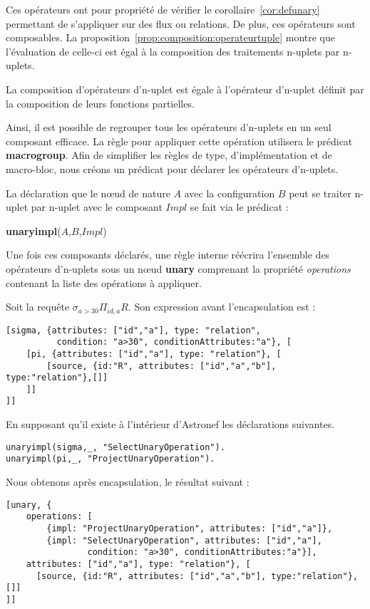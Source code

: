 Ces opérateurs ont pour propriété de vérifier le corollaire~\ref{cor:defunary} permettant de s'appliquer sur des flux ou relations. De plus, ces opérateurs sont composables. La proposition~\ref{prop:composition:operateurtuple} montre que l'évaluation de celle-ci est égal à la composition des traitements n-uplets par n-uplets.
\begin{prop}\label{prop:composition:operateurtuple}
    La composition d'opérateurs d'n-uplet est égale à l'opérateur d'n-uplet définit par la composition de leurs fonctions partielles.
\end{prop}

Ainsi, il est possible de regrouper tous les opérateurs d'n-uplets en un seul composant efficace. La règle pour appliquer cette opération utilisera le prédicat \textbf{macrogroup}. Afin de simplifier les règles de type, d'implémentation et de macro-bloc, nous créons un prédicat pour déclarer les opérateurs d'n-uplets.
\begin{regle}
La déclaration que le nœud de nature $A$ avec la configuration $B$ peut se traiter n-uplet par n-uplet avec le composant $Impl$ se fait via le prédicat :
\begin{center}\textbf{unaryimpl}($A$,$B$,$Impl$)\end{center}
\end{regle}

Une fois ces composants déclarés, une règle interne réécrira l'ensemble des opérateurs d'n-uplets sous un nœud \textbf{unary} comprenant la propriété \textit{operations} contenant la liste des opérations à appliquer.
\begin{example}
Soit la requête $\sigma_{a > 30}\Pi_{id,a} R$. Son expression avant l'encapsulation est :
\begin{lstlisting}
[sigma, {attributes: ["id","a"], type: "relation", 
		  condition: "a>30", conditionAttributes:"a"}, [
	[pi, {attributes: ["id","a"], type: "relation"}, [
		[source, {id:"R", attributes: ["id","a","b"], type:"relation"},[]]
	]]
]]
\end{lstlisting}

En supposant qu'il existe à l'intérieur d'Astronef les déclarations suivantes.
\begin{lstlisting}
unaryimpl(sigma,_, "SelectUnaryOperation").
unaryimpl(pi,_, "ProjectUnaryOperation").
\end{lstlisting}

Nous obtenons après encapsulation, le résultat suivant :
\begin{lstlisting}
[unary, {
	operations: [
		{impl: "ProjectUnaryOperation", attributes: ["id","a"]},
		{impl: "SelectUnaryOperation", attributes: ["id","a"], 
				condition: "a>30", conditionAttributes:"a"}], 
	attributes: ["id","a"], type: "relation"}, [
	  [source, {id:"R", attributes: ["id","a","b"], type:"relation"},[]]
]]
\end{lstlisting}
\end{example}


